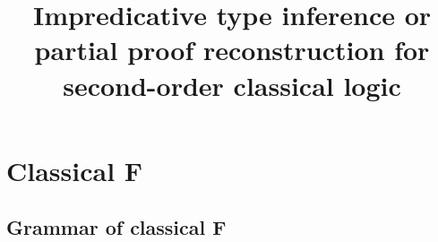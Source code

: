 \documentclass{amsart}
\title
[Impredicative type inference]
{
Impredicative type inference
\break
or
\break
partial proof reconstruction \break
for second-order classical logic
}
\begin{document}
\newcommand{\nc}{\newcommand}
\newcommand{\DotExpr}[2]{#1 #2.\ }
\nc\Abs    {\DotExpr\lambda}
\nc\All    {\DotExpr\forall}
\nc\Allin  {\forall\mathrm{in}}
\nc\Allex  {\forall\mathrm{ex}}
\nc\Brouwer{\operatorname{Brouwer}}
\nc\CallCC {\mathrm{call/cc}}
\nc\Case   {}
\nc\Cps    {\operatorname{cps}}
\nc\Dn[1]  {(#1 \R \bot) \R \bot}
\nc\Dni    {\mathrm{\neg\neg I}}
\nc\Ex     {\DotExpr\exists}
\nc\Exin   {\exists\mathrm{in}}
\nc\Exex   {\exists\mathrm{ex}}
\nc\FV     {\operatorname{FV}}
\nc\Id     {\mathit{id}}
\nc\Indent {\hspace{3em}}
\nc\Mgs    {\operatorname{mgs}}
\nc\Nuke   {\mathrm{nuke}}
\nc\Or     {\ | \ }
\nc\Prune  {\operatorname{prune}}
\nc\Recall {\DotExpr\Xi} %
\nc\Redo   {\operatorname{redo}}
\nc\Tabs   {\DotExpr\Lambda}
\nc\R      {\rightarrow}
\nc\Undo   {\operatorname{undo}}
\nc\Unify  {\operatorname{unify}}
\maketitle
\tableofcontents

\section{Classical F}

\subsection{Grammar of classical F}

\nc\Ftype{
\tau & ::= & \alpha & \mbox{type variable} \\
&\Or& \tau \rightarrow \tau & \mbox{function type} \\
&\Or& \All\alpha\tau & \mbox{universal type} \\
}

\nc\CFtype{
\Ftype
&\Or& \Ex\alpha\tau & \mbox{existential type} \\
}

\nc\CFterm{
t & ::= & x & \mbox{variables} \\
&\Or& \Abs{x:\tau}t  & \mbox{lambda abstraction} \\
&\Or& \ t~t & \mbox{function application} \\
}

\nc\SelectiveTypeAmnesia{
&\Or& t~\{\Ex\alpha\tau\} & \mbox{selective type amnesia} \\
}

\nc\TypingContexts{
\Gamma & ::= & \Gamma, x : \tau & \mbox{term variable binding}\\
&\Or& \Gamma, \alpha& \mbox{type variable binding} \\
&\Or& \epsilon & \mbox{empty context}\\ \\
}
\end{document}
